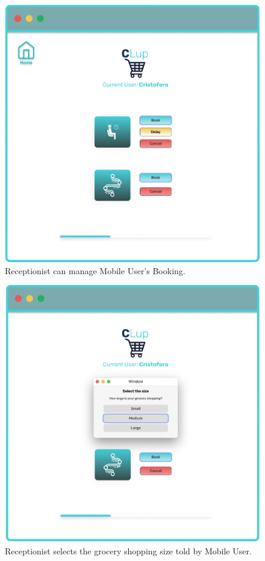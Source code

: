 \begin{figure}[H]
  \caption{Receptionist can manage Mobile User's Booking.}
  \label{fig:Login}
  \centering
  \includegraphics[scale=0.32]{images/mockup/Home_Rec.png}

\end{figure}


\begin{figure}[H]
  \caption{Receptionist selects the grocery shopping size told by Mobile User.}
  \label{fig:Login}
  \centering
  \includegraphics[scale=0.31]{images/mockup/Size_Rec.png}

\end{figure}


